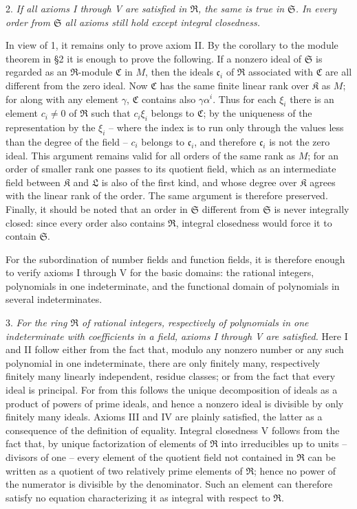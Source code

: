 \documentclass[11pt]{article}
\providecommand{\mR}{\mathfrak{R}}
\providecommand{\mK}{\mathfrak{K}}
\providecommand{\mL}{\mathfrak{L}}
\providecommand{\mS}{\mathfrak{S}}
\providecommand{\mC}{\mathfrak{C}}
\providecommand{\mc}{\mathfrak{c}}
\begin{document}
2. \emph{If all axioms I through V are satisfied in $\mR$, the same is true in $\mS$. In every order from $\mS$ all axioms still hold except integral closedness.}

In view of 1, it remains only to prove axiom II. By the corollary to the module theorem in §2 it is enough to prove the following. If a nonzero ideal of $\mS$ is regarded as an $\mR$-module $\mC$ in $M$, then the ideals $\mc_i$ of $\mR$ associated with $\mC$ are all different from the zero ideal. Now $\mC$ has the same finite linear rank over $\mK$ as $M$; for along with any element $\gamma$, $\mC$ contains also $\gamma\alpha^i$. Thus for each $\xi_i$ there is an element $c_i\ne0$ of $\mR$ such that $c_i\xi_i$ belongs to $\mC$; by the uniqueness of the representation by the $\xi_i$ -- where the index is to run only through the values less than the degree of the field -- $c_i$ belongs to $\mc_i$, and therefore $\mc_i$ is not the zero ideal. This argument remains valid for all orders of the same rank as $M$; for an order of smaller rank one passes to its quotient field, which as an intermediate field between $\mK$ and $\mL$ is also of the first kind, and whose degree over $\mK$ agrees with the linear rank of the order. The same argument is therefore preserved. Finally, it should be noted that an order in $\mS$ different from $\mS$ is never integrally closed: since every order also contains $\mR$, integral closedness would force it to contain $\mS$.

For the subordination of number fields and function fields, it is therefore enough to verify axioms I through V for the basic domains: the rational integers, polynomials in one indeterminate, and the functional domain of polynomials in several indeterminates.

3. \emph{For the ring $\mR$ of rational integers, respectively of polynomials in one indeterminate with coefficients in a field, axioms I through V are satisfied.} Here I and II follow either from the fact that, modulo any nonzero number or any such polynomial in one indeterminate, there are only finitely many, respectively finitely many linearly independent, residue classes; or from the fact that every ideal is principal. For from this follows the unique decomposition of ideals as a product of powers of prime ideals, and hence a nonzero ideal is divisible by only finitely many ideals. Axioms III and IV are plainly satisfied, the latter as a consequence of the definition of equality. Integral closedness V follows from the fact that, by unique factorization of elements of $\mR$ into irreducibles up to units -- divisors of one -- every element of the quotient field not contained in $\mR$ can be written as a quotient of two relatively prime elements of $\mR$; hence no power of the numerator is divisible by the denominator. Such an element can therefore satisfy no equation characterizing it as integral with respect to $\mR$.
\end{document}
